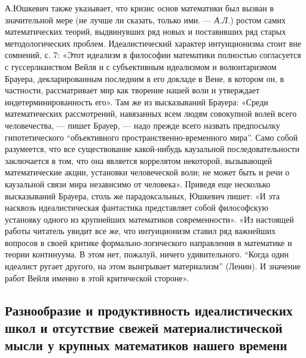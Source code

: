 А.Юшкевич  также указывает,  что  кризис основ  математики был  вызван
в  значительной   мере  (не   лучше  ли   сказать,  только   ими.  ---
\emph{А.Л.}) ростом самих математических теорий, выдвинувших ряд новых
и  поставивших ряд  старых  методологических проблем.  Идеалистический
характер  интуиционизма  стоит  вне  сомнений, с.  7:  «Этот  идеализм
в  философии   математики  полностью  согласуется   с  гуссерлианством
Вейля   и  с   субъективным   идеализмом   и  волюнтаризмом   Брауера,
декларированным  последним в  его  докладе  в Вене,  в  котором он,  в
частности,  рассматривает мир  как  творение нашей  воли и  утверждает
индетерминированность  его». Там  же из  высказываний Брауера:  «Среди
математических  рассмотрений, навязанных  всем людям  совокупной волей
всего человечества,  --- пишет Брауер,  --- надо прежде  всего назвать
предпосылку гипотетического  ``объективного пространственно-временного
мира''.  Само собой  разумеется,  что  все существование  какой-нибудь
каузальной  последовательности заключается  в  том,  что она  является
коррелятом  некоторой,  вызывающей   математические  акции,  установки
человеческой  воли;   не  может  быть   и  речи  о   каузальной  связи
мира  независимо  от  человека». Приведя  еще  несколько  высказываний
Брауера,  столь  же парадоксальных,  Юшкевич  пишет:  «И эта  насквозь
идеалистическая  фантастика представляет  собой философскую  установку
одного из крупнейших математиков  современности». «Из настоящей работы
читатель увидит все же, что интуиционизм ставил ряд важнейших вопросов
в  своей  критике  формально-логического направления  в  математике  и
теории континуума. В этом  нет, пожалуй, ничего удивительного. ``Когда
один  идеалист  ругает  другого,   на  этом  выигрывает  материализм''
(Ленин). И значение работ Вейля именно в этой критической стороне».

\subsection{Разнообразие  и  продуктивность   идеалистических  школ  и
отсутствие  свежей  материалистической  мысли  у  крупных  математиков
нашего времени}

